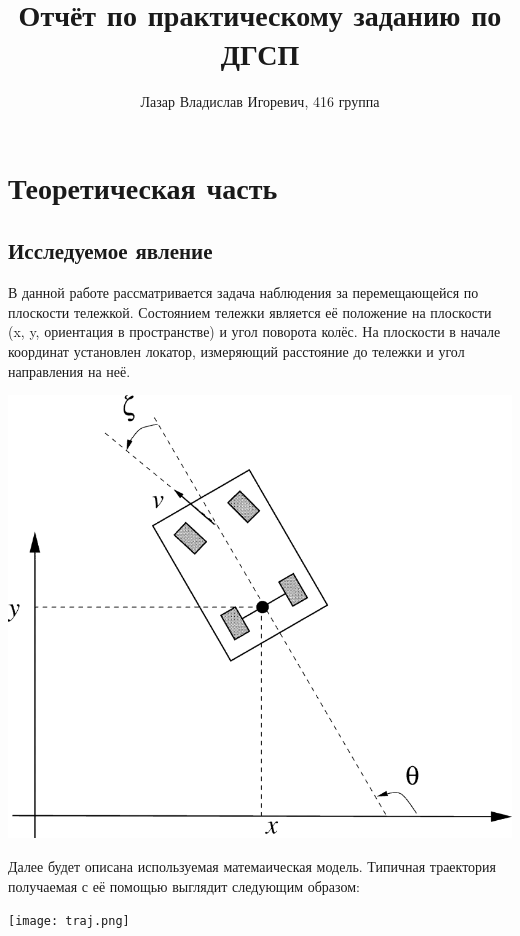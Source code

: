 \documentclass[12pt]{article}
\author{Лазар Владислав Игоревич, 416 группа}
\title{Отчёт по практическому заданию по ДГСП}
\begin{document}
\maketitle

\tableofcontents

\newpage

\section{Теоретическая часть}

\subsection{Исследуемое явление}

В данной работе рассматривается задача наблюдения за перемещающейся по плоскости тележкой. Состоянием тележки является её положение на плоскости (x, y, ориентация в пространстве) и угол поворота колёс. На плоскости в начале координат установлен локатор, измеряющий расстояние до тележки и угол направления на неё.
\newline

\includegraphics[width=1.0\linewidth]{../system.png}

\newpage

Далее будет описана используемая матемаическая модель. Типичная траектория получаемая с её помощью выглядит следующим образом:

\texttt{[image: traj.png]}
\end{document}
